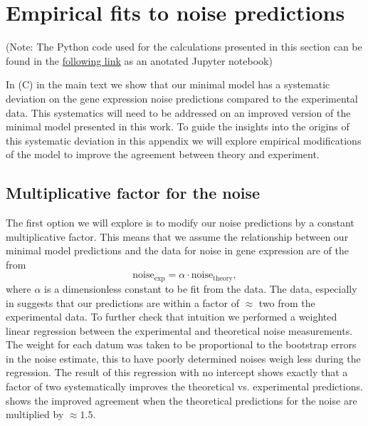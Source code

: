 \section{Empirical fits to noise predictions} \label{supp_empirical}

(Note: The Python code used for the calculations presented in this section can
be found in the
\href{https://www.rpgroup.caltech.edu/chann_cap/src/theory/html/empirical_constants.html}{following
link} as an anotated Jupyter notebook)

In (C) in the main text we show that our minimal model has
a systematic deviation on the gene expression noise predictions compared to the
experimental data. This systematics will need to be addressed on an improved
version of the minimal model presented in this work. To guide the insights into
the origins of this systematic deviation in this appendix we will explore
empirical modifications of the model to improve the agreement between theory and
experiment.

\subsection{Multiplicative factor for the noise}
\label{supp_mult_factor_noise}

The first option we will explore is to modify our noise predictions by a
constant multiplicative factor. This means that we assume the relationship
between our minimal model predictions and the data for noise in gene expression
are of the from
\begin{equation}
    \text{noise}_{\text{exp}} = \alpha \cdot \text{noise}_{\text{theory}},
\end{equation}
where $\alpha$ is a dimensionless constant to be fit from the data. The data,
especially in  suggests that our predictions are within a
factor of $\approx$ two from the experimental data. To further check that
intuition we performed a weighted linear regression between the experimental and
theoretical noise measurements. The weight for each datum was taken to be
proportional to the bootstrap errors in the noise estimate, this to have poorly
determined noises weigh less during the regression. The result of this
regression with no intercept shows exactly that a factor of two systematically
improves the theoretical vs. experimental predictions.
 shows the improved agreement when the theoretical
predictions for the noise are multiplied by $\approx 1.5$.

